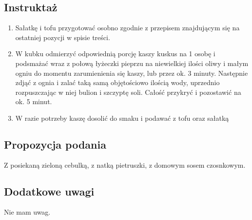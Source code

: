 \vspace{0.5cm}

\subsection*{Instruktaż}
\begin{enumerate}
    \item Sałatkę i tofu przygotować osobno zgodnie z przepisem znajdującym się na ostatniej pozycji w spisie treści.
    \item W kubku odmierzyć odpowiednią porcję kaszy kuskus na 1 osobę i podsmażać wraz z połową łyżeczki pieprzu na niewielkiej ilości oliwy i małym ogniu do momentu zarumienienia się kaszy, lub przez ok. 3 minuty. Następnie zdjąć z ognia i zalać taką samą objętościowo ilością wody, uprzednio rozpuszczając w niej bulion i szczyptę soli. Całość przykryć i pozostawić na ok. 5 minut.
    \item W razie potrzeby kaszę dosolić do smaku i podawać z tofu oraz sałatką
\end{enumerate}

\vspace{0.5cm}

\small
\subsection*{Propozycja podania}
Z posiekaną zieloną cebulką, z natką pietruszki, z domowym sosem czosnkowym.

\vspace{0.3cm}

\subsection*{Dodatkowe uwagi}
Nie mam uwag.

\newpage
